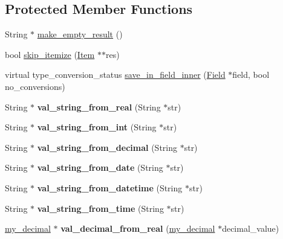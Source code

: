 \subsection*{Protected Member Functions}
\begin{DoxyCompactItemize}
\item 
String $\ast$ \mbox{\hyperlink{classItem_ad087824772daf5ea1dad82d52b16255c}{make\+\_\+empty\+\_\+result}} ()
\item 
bool \mbox{\hyperlink{classItem_a0630371e331f83a8d258952a52cc5c72}{skip\+\_\+itemize}} (\mbox{\hyperlink{classItem}{Item}} $\ast$$\ast$res)
\item 
virtual type\+\_\+conversion\+\_\+status \mbox{\hyperlink{classItem_a463ded5f3c21ed2508dd8fddc6024722}{save\+\_\+in\+\_\+field\+\_\+inner}} (\mbox{\hyperlink{classField}{Field}} $\ast$field, bool no\+\_\+conversions)
\item 
\mbox{\label{classItem_af93c6ce0f62695eddc62271ec58195f1}} 
String $\ast$ {\bfseries val\+\_\+string\+\_\+from\+\_\+real} (String $\ast$str)
\item 
\mbox{\label{classItem_a10e54916ef80f2f042ae696542b766b7}} 
String $\ast$ {\bfseries val\+\_\+string\+\_\+from\+\_\+int} (String $\ast$str)
\item 
\mbox{\label{classItem_afe90083f549a48da15a8edfaa28d7463}} 
String $\ast$ {\bfseries val\+\_\+string\+\_\+from\+\_\+decimal} (String $\ast$str)
\item 
\mbox{\label{classItem_a22d6e279a15f5ef46d5f6f63dcfaa8ec}} 
String $\ast$ {\bfseries val\+\_\+string\+\_\+from\+\_\+date} (String $\ast$str)
\item 
\mbox{\label{classItem_a2f550d4d08d6686db96833b172250f43}} 
String $\ast$ {\bfseries val\+\_\+string\+\_\+from\+\_\+datetime} (String $\ast$str)
\item 
\mbox{\label{classItem_ae1f8005f8ea489e0225a880070465885}} 
String $\ast$ {\bfseries val\+\_\+string\+\_\+from\+\_\+time} (String $\ast$str)
\item 
\mbox{\label{classItem_a97b88aaeff9a1abd26a648bd84b7a8ca}} 
\mbox{\hyperlink{classmy__decimal}{my\+\_\+decimal}} $\ast$ {\bfseries val\+\_\+decimal\+\_\+from\+\_\+real} (\mbox{\hyperlink{classmy__decimal}{my\+\_\+decimal}} $\ast$decimal\+\_\+value)
$$
\end{DoxyCompactItemize}
